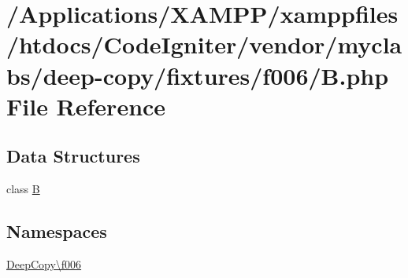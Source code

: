 \hypertarget{f006_2_b_8php}{}\section{/\+Applications/\+X\+A\+M\+P\+P/xamppfiles/htdocs/\+Code\+Igniter/vendor/myclabs/deep-\/copy/fixtures/f006/B.php File Reference}
\label{f006_2_b_8php}
\subsection*{Data Structures}
\begin{DoxyCompactItemize}
\item 
class \mbox{\hyperlink{class_deep_copy_1_1f006_1_1_b}{B}}
\end{DoxyCompactItemize}
\subsection*{Namespaces}
\begin{DoxyCompactItemize}
\item 
 \mbox{\hyperlink{namespace_deep_copy_1_1f006}{Deep\+Copy\textbackslash{}f006}}
\end{DoxyCompactItemize}
